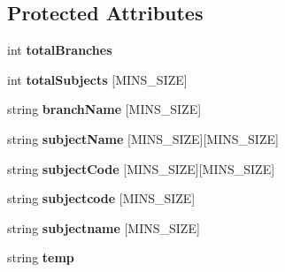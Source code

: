 \subsection*{Protected Attributes}
\begin{DoxyCompactItemize}
\item 
\hypertarget{classReadBranchDetails_a3454b3b4a6ea8c41727f9720fc9e091a}{int {\bfseries total\-Branches}}\label{classReadBranchDetails_a3454b3b4a6ea8c41727f9720fc9e091a}

\item 
\hypertarget{classReadBranchDetails_a59b8eeaa46e9e26dcde52c952f48f31e}{int {\bfseries total\-Subjects} \mbox{[}M\-I\-N\-S\-\_\-\-S\-I\-Z\-E\mbox{]}}\label{classReadBranchDetails_a59b8eeaa46e9e26dcde52c952f48f31e}

\item 
\hypertarget{classReadBranchDetails_a6e3cae6c059d37b2570729da82c2ea46}{string {\bfseries branch\-Name} \mbox{[}M\-I\-N\-S\-\_\-\-S\-I\-Z\-E\mbox{]}}\label{classReadBranchDetails_a6e3cae6c059d37b2570729da82c2ea46}

\item 
\hypertarget{classReadBranchDetails_aea3079c6dbc33a98f6dd77a625683a48}{string {\bfseries subject\-Name} \mbox{[}M\-I\-N\-S\-\_\-\-S\-I\-Z\-E\mbox{]}\mbox{[}M\-I\-N\-S\-\_\-\-S\-I\-Z\-E\mbox{]}}\label{classReadBranchDetails_aea3079c6dbc33a98f6dd77a625683a48}

\item 
\hypertarget{classReadBranchDetails_a8b56c2864f91301eda7c5a23b2a4ff03}{string {\bfseries subject\-Code} \mbox{[}M\-I\-N\-S\-\_\-\-S\-I\-Z\-E\mbox{]}\mbox{[}M\-I\-N\-S\-\_\-\-S\-I\-Z\-E\mbox{]}}\label{classReadBranchDetails_a8b56c2864f91301eda7c5a23b2a4ff03}

\item 
\hypertarget{classReadBranchDetails_a9b0ae22c37569561b2af60ec48c26694}{string {\bfseries subjectcode} \mbox{[}M\-I\-N\-S\-\_\-\-S\-I\-Z\-E\mbox{]}}\label{classReadBranchDetails_a9b0ae22c37569561b2af60ec48c26694}

\item 
\hypertarget{classReadBranchDetails_a29ea18a15c1978dea055fa3190ce9cba}{string {\bfseries subjectname} \mbox{[}M\-I\-N\-S\-\_\-\-S\-I\-Z\-E\mbox{]}}\label{classReadBranchDetails_a29ea18a15c1978dea055fa3190ce9cba}

\item 
\hypertarget{classReadBranchDetails_a3ca6bc0951aaa5bddcb87d773d23f7eb}{string {\bfseries temp}}\label{classReadBranchDetails_a3ca6bc0951aaa5bddcb87d773d23f7eb}


\end{DoxyCompactItemize}

